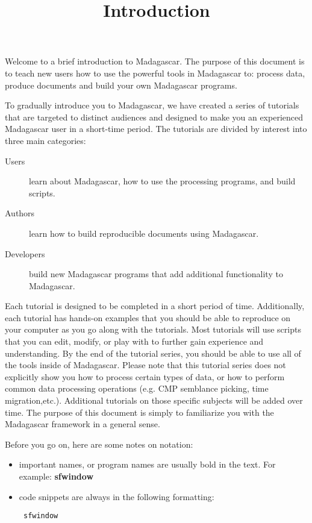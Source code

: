 \title{Introduction}
Welcome to a brief introduction to Madagascar.  The purpose of this
document is to teach new users how to use the powerful tools in
Madagascar to: process data, produce documents and build your own
Madagascar programs.

To gradually introduce you to Madagascar, we have created a series of
tutorials that are targeted to distinct audiences and designed to make
you an experienced Madagascar user in a short-time period.  The
tutorials are divided by interest into three main categories:
\begin{description}
    \item[Users] learn about Madagascar, how to use the processing programs, and build scripts.
    \item[Authors] learn how to build reproducible documents using Madagascar.
    \item[Developers] build new Madagascar programs that add additional functionality to Madagascar.
\end{description}

Each tutorial is designed to be completed in a short period of time.
Additionally, each tutorial has hands-on examples that you should be
able to reproduce on your computer as you go along with the tutorials.
Most tutorials will use scripts that you can edit, modify, or play
with to further gain experience and understanding.  By the end of the
tutorial series, you should be able to use all of the tools inside of
Madagascar.  Please note that this tutorial series does not explicitly
show you how to process certain types of data, or how to perform common data
processing operations (e.g. CMP semblance picking,
time migration,etc.).  Additional tutorials on those specific subjects
will be added over time.  The purpose of this document is simply to
familiarize you with the Madagascar framework in a general sense.

Before you go on, here are some notes on notation:
\begin{itemize}
    \item important names, or program names are usually bold in the text.  For example: \textbf{sfwindow}
    \item code snippets are always in the following formatting: \begin{verbatim} sfwindow \end{verbatim}
\end{itemize}
